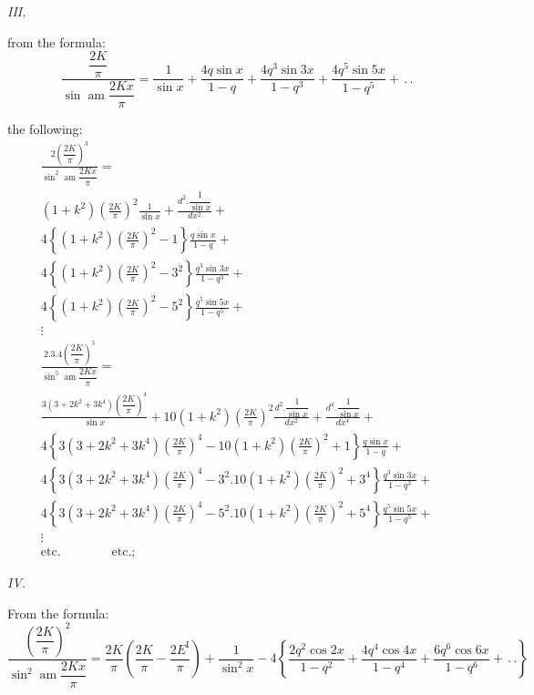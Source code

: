 \documentclass{article}
\begin{document}
\emph{III.}

from the formula:
\[
\frac{\dfrac{2K}{\pi}}{\sin\operatorname{am}\dfrac{2Kx}{\pi}}=\frac{1}{\sin x}+\frac{4q\sin x}{1-q}+\frac{4q^{3}\sin 3x}{1-q^{3}}+\frac{4q^{5}\sin 5x}{1-q^{5}}+\,.\,.
\]

the following:
\[
\begin{gathered}
\frac{2\left(\dfrac{2K}{\pi}\right)^{3}}{\sin^{2}\operatorname{am}\dfrac{2Kx}{\pi}}=\\[1.5ex]
(1+k^{2})\left(\frac{2K}{\pi}\right)^{2}\frac{1}{\sin x}+\frac{d^{2}.\dfrac{1}{\sin x}}{dx^{2}}+\\[1.5ex]
4\left\{(1+k^{2})\left(\frac{2K}{\pi}\right)^{2}-1\right\}\frac{q\sin x}{1-q}+\\[1.5ex]
4\left\{(1+k^{2})\left(\frac{2K}{\pi}\right)^{2}-3^{2}\right\}\frac{q^{3}\sin 3x}{1-q^{3}}+\\[1.5ex]
4\left\{(1+k^{2})\left(\frac{2K}{\pi}\right)^{2}-5^{2}\right\}\frac{q^{5}\sin 5x}{1-q^{5}}+\\[1.5ex]
\vdots\\[1.5ex]
\frac{2.3.4\left(\dfrac{2K}{\pi}\right)^{5}}{\sin^{5}\operatorname{am}\dfrac{2Kx}{\pi}}=\\[1.5ex]
\frac{3(3+2k^{2}+3k^{4})\left(\dfrac{2K}{\pi}\right)^{4}}{\sin x}+10(1+k^{2})\left(\frac{2K}{\pi}\right)^{2}\frac{d^{2}.\dfrac{1}{\sin x}}{dx^{2}}+\frac{d^{4}.\dfrac{1}{\sin x}}{dx^{4}}+\\[1.5ex]
4\left\{3(3+2k^{2}+3k^{4})\left(\frac{2K}{\pi}\right)^{4}-10(1+k^{2})\left(\frac{2K}{\pi}\right)^{2}+1\right\}\frac{q\sin x}{1-q}+\\[1.5ex]
4\left\{3(3+2k^{2}+3k^{4})\left(\frac{2K}{\pi}\right)^{4}-3^{2}.10(1+k^{2})\left(\frac{2K}{\pi}\right)^{2}+3^{4}\right\}\frac{q^{3}\sin 3x}{1-q^{3}}+\\[1.5ex]
4\left\{3(3+2k^{2}+3k^{4})\left(\frac{2K}{\pi}\right)^{4}-5^{2}.10(1+k^{2})\left(\frac{2K}{\pi}\right)^{2}+5^{4}\right\}\frac{q^{5}\sin 5x}{1-q^{5}}+\\[1.5ex]
\vdots\\[1.5ex]
\text{etc.}\qquad\qquad\text{etc.};
\end{gathered}
\]

\emph{IV.}

From the formula:
\[
\frac{\left(\dfrac{2K}{\pi}\right)^{2}}{\sin^{2}\operatorname{am}\dfrac{2Kx}{\pi}}=\frac{2K}{\pi}\left(\frac{2K}{\pi}-\frac{2E^{\mathrm{I}}}{\pi}\right)+\frac{1}{\sin^{2}x}-4\left\{\frac{2q^{2}\cos 2x}{1-q^{2}}+\frac{4q^{4}\cos 4x}{1-q^{4}}+\frac{6q^{6}\cos 6x}{1-q^{6}}+\,.\,.\right\}
\]
\end{document}
